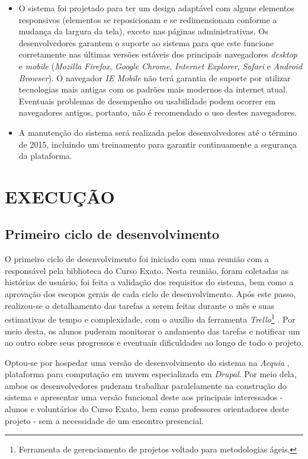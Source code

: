 \documentclass[a4paper]{article}
\begin{document}
\begin{itemize}
\item O sistema foi projetado para ter um design adaptável com alguns elementos responsivos (elementos se reposicionam e se redimensionam conforme a mudança da largura da tela), exceto nas páginas administrativas. Os desenvolvedores garantem o suporte ao sistema para que este funcione corretamente nas últimas versões estáveis dos principais navegadores \textit{desktop} e \textit{mobile} (\textit{Mozilla Firefox}, \textit{Google Chrome}, \textit{Internet Explorer}, \textit{Safari} e \textit{Android Browser}). O navegador \textit{IE Mobile} não terá garantia de suporte por utilizar tecnologias mais antigas com os padrões mais modernos da internet atual. Eventuais problemas de desempenho ou usabilidade podem ocorrer em navegadores antigos, portanto, não é recomendado o uso destes navegadores. 

\item A manutenção do sistema será realizada pelos desenvolvedores até o término de 2015, incluindo um treinamento para garantir continuamente a segurança da plataforma.

\end{itemize}


\pagebreak
\section{EXECUÇÃO}
\subsection{Primeiro ciclo de desenvolvimento}
O primeiro ciclo de desenvolvimento foi iniciado com uma reunião com a responsável pela biblioteca do Curso Exato. Nesta reunião, foram coletadas as histórias de usuário, foi feita a validação dos requisitos do sistema, bem como a aprovação dos escopos gerais de cada ciclo de desenvolvimento. Após este passo, realizou-se o detalhamento das tarefas a serem feitas durante o mês e suas estimativas de tempo e complexidade, com o auxílio da ferramenta \textit{Trello}\footnote{Ferramenta de gerenciamento de projetos voltado para metodologias ágeis.} \cite{trello}. Por meio desta, os alunos puderam monitorar o andamento das tarefas e notificar um ao outro sobre seus progressos e eventuais dificuldades ao longo de todo o projeto.

Optou-se por hospedar uma versão de desenvolvimento do sistema na \textit{Acquia} \cite{acquia}, plataforma para computação em nuvem especializada em \textit{Drupal}. Por meio dela, ambos os desenvolvedores puderam trabalhar paralelamente na construção do sistema e apresentar uma versão funcional deste aos principais interessados - alunos e voluntários do Curso Exato, bem como professores orientadores deste projeto - sem a necessidade de um encontro presencial.
\end{document}
